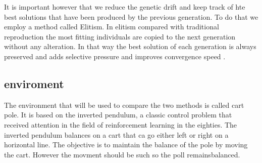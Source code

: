 It is important however that we reduce the genetic drift and keep track of hte best solutions that have been produced by the previous generation. To do that we employ a method called Elitism. In elitism compared with traditional reproduction the most fitting individuals are copied to the next generation without any alteration. In that way the best solution of each generation is always preserved and adds selective pressure and improves convergence speed \cite{du2018elitism}.

\subsection{enviroment}
The environment that will be used to compare the two methods is called cart pole. It is based on the inverted pendulum, a classic control problem that received attention in the field of reinforcement learning in the eighties. The inverted pendulum balances on a cart that ca go either left or right on a horizontal line. The objective is to maintain the balance of the pole by moving the cart. However the movment should be such so the poll remainsbalanced\cite{moriarty1996efficient}. 
